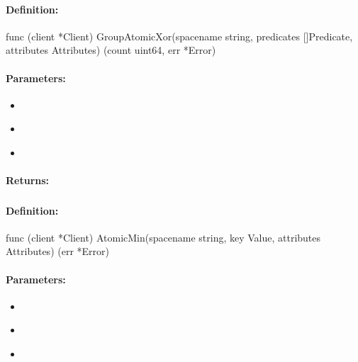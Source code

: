 \paragraph{Definition:}
\begin{gocode}
func (client *Client) GroupAtomicXor(spacename string, predicates []Predicate, attributes Attributes) (count uint64, err *Error)
\end{gocode}

\paragraph{Parameters:}
\begin{itemize}[noitemsep]
\item {}\\

\item {}\\

\item {}\\

\end{itemize}

\paragraph{Returns:}


\pagebreak
\subsubsection{}
\label{api:Go:AtomicMin}


\paragraph{Definition:}
\begin{gocode}
func (client *Client) AtomicMin(spacename string, key Value, attributes Attributes) (err *Error)
\end{gocode}

\paragraph{Parameters:}
\begin{itemize}[noitemsep]
\item {}\\

\item {}\\

\item {}\\

\end{itemize}

